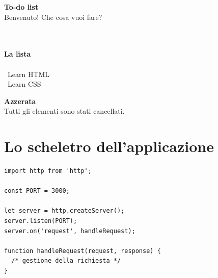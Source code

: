 \noindent\begin{minipage}[t]{0.31\linewidth}
\begin{browser}[localhost:3000/]
  {\Lora\bfseries\large To-do list}\\[3pt]
  Benvenuto! Che cosa vuoi fare?\\[3pt]
  \textbullet\ \\
  \textbullet\ 
\end{browser}
\end{minipage}\hfill
\begin{minipage}[t]{0.35\linewidth}
\begin{browser}
  {\Lora\bfseries\large La lista}\\[3pt]
  \ \\[3pt]
  \textbullet\ Learn HTML\\
  \textbullet\ Learn CSS
\end{browser}
\end{minipage}\hfill
\begin{minipage}[t]{0.30\linewidth}
\begin{browser}
  {\Lora\bfseries\large Azzerata}\\[3pt]
  Tutti gli elementi sono stati cancellati.\\[3pt]
\end{browser}
\end{minipage}

\section{Lo scheletro dell'applicazione}

\begin{affianco}[0.5][c]
\begin{lstlisting}[style=js, name=app.js]
import http from 'http';

const PORT = 3000;

let server = http.createServer();
server.listen(PORT);
server.on('request', handleRequest);

function handleRequest(request, response) {
  /* gestione della richiesta */
}
\end{lstlisting}
\risultato
\begin{immagine}
\end{immagine}
\end{affianco}

